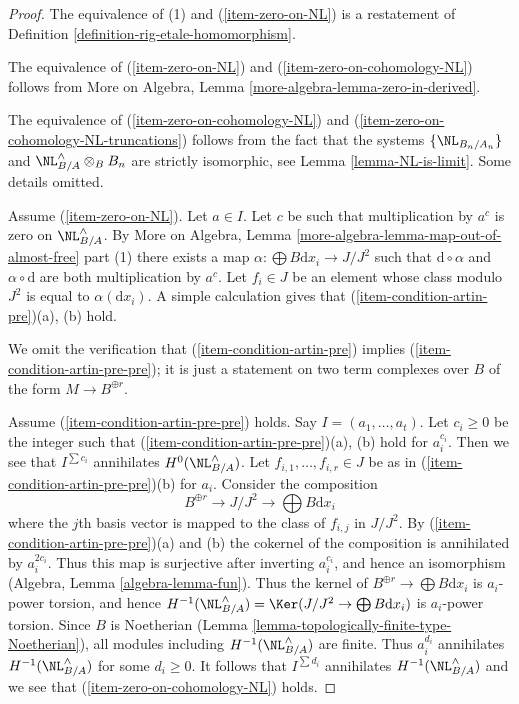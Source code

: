 \begin{proof}
The equivalence of (1) and (\ref{item-zero-on-NL}) is a restatement of
Definition \ref{definition-rig-etale-homomorphism}.

\medskip\noindent
The equivalence of (\ref{item-zero-on-NL}) and
(\ref{item-zero-on-cohomology-NL}) follows from
More on Algebra, Lemma \ref{more-algebra-lemma-zero-in-derived}.

\medskip\noindent
The equivalence of (\ref{item-zero-on-cohomology-NL})
and (\ref{item-zero-on-cohomology-NL-truncations}) follows from the fact that
the systems $\{\NL_{B_n/A_n}\}$ and $\NL_{B/A}^\wedge \otimes_B B_n$
are strictly isomorphic, see Lemma \ref{lemma-NL-is-limit}.
Some details omitted.

\medskip\noindent
Assume (\ref{item-zero-on-NL}). Let $a \in I$.
Let $c$ be such that multiplication by $a^c$ is zero on $\NL_{B/A}^\wedge$. By
More on Algebra, Lemma \ref{more-algebra-lemma-map-out-of-almost-free}
part (1) there exists a map $\alpha : \bigoplus B\text{d}x_i \to J/J^2$
such that $\text{d} \circ \alpha$ and $\alpha \circ \text{d}$ are both
multiplication by $a^c$. Let $f_i \in J$ be an element whose
class modulo $J^2$ is equal to $\alpha(\text{d}x_i)$.
A simple calculation gives that (\ref{item-condition-artin-pre})(a), (b) hold.

\medskip\noindent
We omit the verification that (\ref{item-condition-artin-pre})
implies (\ref{item-condition-artin-pre-pre}); it is just a statement
on two term complexes over $B$ of the form $M \to B^{\oplus r}$.

\medskip\noindent
Assume (\ref{item-condition-artin-pre-pre}) holds.
Say $I = (a_1, \ldots, a_t)$. Let $c_i \geq 0$ be the integer such that
(\ref{item-condition-artin-pre-pre})(a), (b)
hold for $a_i^{c_i}$. Then we see that $I^{\sum c_i}$ annihilates
$H^0(\NL_{B/A}^\wedge)$. Let $f_{i, 1}, \ldots, f_{i, r} \in J$
be as in (\ref{item-condition-artin-pre-pre})(b) for $a_i$.
Consider the composition
$$
B^{\oplus r} \to J/J^2 \to \bigoplus B\text{d}x_i
$$
where the $j$th basis vector is mapped to the class of $f_{i, j}$ in $J/J^2$.
By (\ref{item-condition-artin-pre-pre})(a) and (b) the cokernel of the
composition is annihilated by $a_i^{2c_i}$. Thus this map is surjective
after inverting $a_i^{c_i}$, and hence an isomorphism
(Algebra, Lemma \ref{algebra-lemma-fun}).
Thus the kernel of $B^{\oplus r} \to \bigoplus B\text{d}x_i$ is
$a_i$-power torsion, and hence
$H^{-1}(\NL_{B/A}^\wedge) = \Ker(J/J^2 \to \bigoplus B\text{d}x_i)$
is $a_i$-power torsion. Since $B$ is Noetherian
(Lemma \ref{lemma-topologically-finite-type-Noetherian}),
all modules including $H^{-1}(\NL_{B/A}^\wedge)$ are finite.
Thus $a_i^{d_i}$ annihilates $H^{-1}(\NL_{B/A}^\wedge)$ for some $d_i \geq 0$.
It follows that $I^{\sum d_i}$ annihilates $H^{-1}(\NL_{B/A}^\wedge)$
and we see that (\ref{item-zero-on-cohomology-NL}) holds.


\end{proof}
